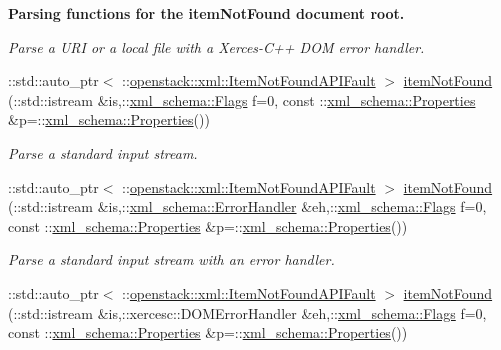 \begin{Indent}{\bf Parsing functions for the itemNotFound document root.}
\begin{DoxyCompactItemize}
\begin{DoxyCompactList}\small\item\em Parse a URI or a local file with a Xerces-\/C++ DOM error handler. \item\end{DoxyCompactList}\item 
::std::auto\_\-ptr$<$ ::\hyperlink{classopenstack_1_1xml_1_1ItemNotFoundAPIFault}{openstack::xml::ItemNotFoundAPIFault} $>$ \hyperlink{namespaceopenstack_1_1xml_a4a201d6300508e2b82accf1715134de4}{itemNotFound} (::std::istream \&is,::\hyperlink{namespacexml__schema_affb4c227cbd9aa7453dd1dc5a1401943}{xml\_\-schema::Flags} f=0, const ::\hyperlink{namespacexml__schema_ad27ce19a7ee1d3b1064092648898f64c}{xml\_\-schema::Properties} \&p=::\hyperlink{namespacexml__schema_ad27ce19a7ee1d3b1064092648898f64c}{xml\_\-schema::Properties}())
\begin{DoxyCompactList}\small\item\em Parse a standard input stream. \item\end{DoxyCompactList}\item 
::std::auto\_\-ptr$<$ ::\hyperlink{classopenstack_1_1xml_1_1ItemNotFoundAPIFault}{openstack::xml::ItemNotFoundAPIFault} $>$ \hyperlink{namespaceopenstack_1_1xml_ad86005411a0efefad03254b30d8c61b8}{itemNotFound} (::std::istream \&is,::\hyperlink{namespacexml__schema_ab1c9361bfd3b404eaabf0c31eded79dc}{xml\_\-schema::ErrorHandler} \&eh,::\hyperlink{namespacexml__schema_affb4c227cbd9aa7453dd1dc5a1401943}{xml\_\-schema::Flags} f=0, const ::\hyperlink{namespacexml__schema_ad27ce19a7ee1d3b1064092648898f64c}{xml\_\-schema::Properties} \&p=::\hyperlink{namespacexml__schema_ad27ce19a7ee1d3b1064092648898f64c}{xml\_\-schema::Properties}())
\begin{DoxyCompactList}\small\item\em Parse a standard input stream with an error handler. \item\end{DoxyCompactList}\item 
::std::auto\_\-ptr$<$ ::\hyperlink{classopenstack_1_1xml_1_1ItemNotFoundAPIFault}{openstack::xml::ItemNotFoundAPIFault} $>$ \hyperlink{namespaceopenstack_1_1xml_ad2ddf27422d86e78bc24bfe918ad4952}{itemNotFound} (::std::istream \&is,::xercesc::DOMErrorHandler \&eh,::\hyperlink{namespacexml__schema_affb4c227cbd9aa7453dd1dc5a1401943}{xml\_\-schema::Flags} f=0, const ::\hyperlink{namespacexml__schema_ad27ce19a7ee1d3b1064092648898f64c}{xml\_\-schema::Properties} \&p=::\hyperlink{namespacexml__schema_ad27ce19a7ee1d3b1064092648898f64c}{xml\_\-schema::Properties}())

\end{DoxyCompactItemize}
\end{Indent}
